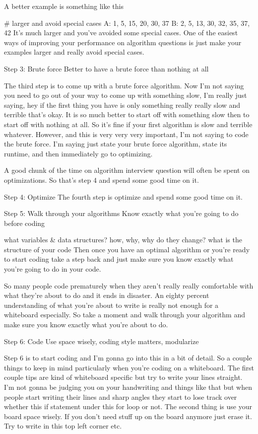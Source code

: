 A better example is something like this

# larger and avoid special cases
A: 1, 5, 15, 20, 30, 37
B: 2, 5, 13, 30, 32, 35, 37, 42
It's much larger and you've avoided some special cases. One of the easiest ways of improving your performance on algorithm questions is just make your examples larger and really avoid special cases.

Step 3: Brute force
Better to have a brute force than nothing at all

The third step is to come up with a brute force algorithm. Now I'm not saying you need to go out of your way to come up with something slow, I'm really just saying, hey if the first thing you have is only something really really slow and terrible that's okay. It is so much better to start off with something slow then to start off with nothing at all. So it's fine if your first algorithm is slow and terrible whatever. However, and this is very very very important, I'm not saying to code the brute force. I'm saying just state your brute force algorithm, state its runtime, and then immediately go to optimizing.

A good chunk of the time on algorithm interview question will often be spent on optimizations. So that's step 4 and spend some good time on it.

Step 4: Optimize
The fourth step is optimize and spend some good time on it.

Step 5: Walk through your algorithms
Know exactly what you're going to do before coding

what variables & data structures?
how, why, why do they change?
what is the structure of your code
Then once you have an optimal algorithm or you're ready to start coding take a step back and just make sure you know exactly what you're going to do in your code.

So many people code prematurely when they aren't really really comfortable with what they're about to do and it ends in disaster. An eighty percent understanding of what you're about to write is really not enough for a whiteboard especially. So take a moment and walk through your algorithm and make sure you know exactly what you're about to do.

Step 6: Code
Use space wisely, coding style matters, modularize

Step 6 is to start coding and I'm gonna go into this in a bit of detail. So a couple things to keep in mind particularly when you're coding on a whiteboard. The first couple tips are kind of whiteboard specific but try to write your lines straight. I'm not gonna be judging you on your handwriting and things like that but when people start writing their lines and sharp angles they start to lose track over whether this if statement under this for loop or not. The second thing is use your board space wisely. If you don't need stuff up on the board anymore just erase it. Try to write in this top left corner etc.

